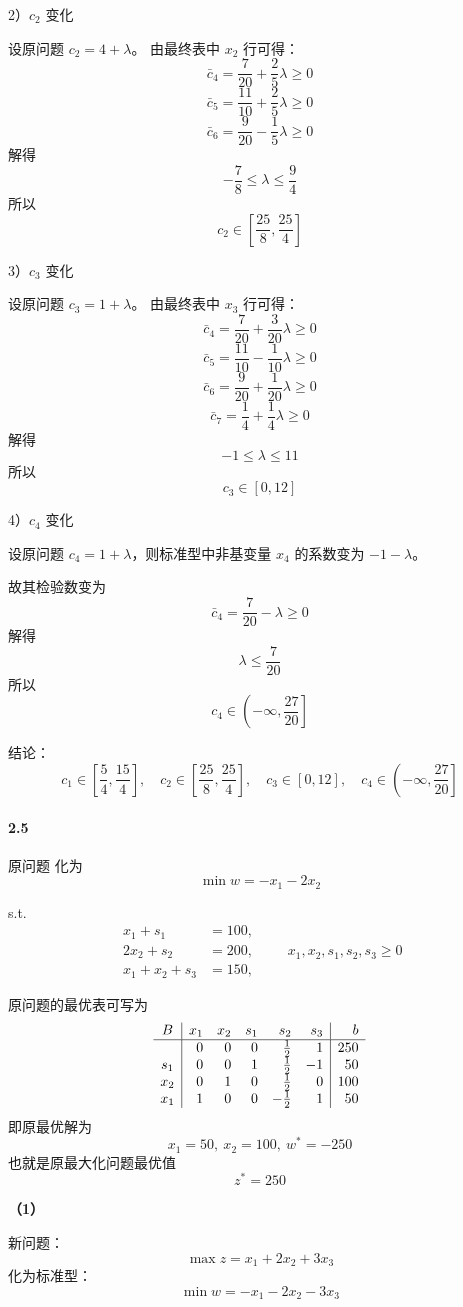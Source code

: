 \documentclass[12pt,a4paper]{article}
\begin{document}
2）$c_2$ 变化

设原问题 $c_2=4+\lambda$。
由最终表中 $x_2$ 行可得：
\[
\bar c_4=\frac7{20}+\frac25\lambda\ge 0
\]
\[
\bar c_5=\frac{11}{10}+\frac25\lambda\ge 0
\]
\[
\bar c_6=\frac9{20}-\frac15\lambda\ge 0
\]
解得
\[
-\frac78\le \lambda\le \frac94
\]
所以
\[
c_2\in \left[\frac{25}8,\frac{25}4\right]
\]

3）$c_3$ 变化

设原问题 $c_3=1+\lambda$。
由最终表中 $x_3$ 行可得：
\[
\bar c_4=\frac7{20}+\frac3{20}\lambda\ge 0
\]
\[
\bar c_5=\frac{11}{10}-\frac1{10}\lambda\ge 0
\]
\[
\bar c_6=\frac9{20}+\frac1{20}\lambda\ge 0
\]
\[
\bar c_7=\frac14+\frac14\lambda\ge 0
\]
解得
\[
-1\le \lambda\le 11
\]
所以
\[
c_3\in [0,12]
\]

4）$c_4$ 变化

设原问题 $c_4=1+\lambda$，则标准型中非基变量 $x_4$ 的系数变为 $-1-\lambda$。

故其检验数变为
\[
\bar c_4=\frac7{20}-\lambda\ge 0
\]
解得
\[
\lambda\le \frac7{20}
\]
所以
\[
c_4\in \left(-\infty,\frac{27}{20}\right]
\]

结论：
\[
c_1\in \left[\frac54,\frac{15}4\right],\quad c_2\in \left[\frac{25}8,\frac{25}4\right],\quad c_3\in [0,12],\quad c_4\in \left(-\infty,\frac{27}{20}\right]
\]

\paragraph{2.5}


原问题
化为
\[
\min w=-x_1-2x_2
\]

s.t.
\[
\begin{aligned}
x_1+s_1&=100,\\
2x_2+s_2&=200,\\
x_1+x_2+s_3&=150,
\end{aligned}
\qquad x_1,x_2,s_1,s_2,s_3\ge 0
\]

原问题的最优表可写为
\[
\begin{array}{c|rrrrr|r}
B & x_1&x_2&s_1&s_2&s_3&b\\
\hline
  & 0&0&0&\frac12&1&250\\
s_1&0&0&1&\frac12&-1&50\\
x_2&0&1&0&\frac12&0&100\\
x_1&1&0&0&-\frac12&1&50
\end{array}
\]
即原最优解为
\[
x_1=50,\ x_2=100,\ w^*=-250
\]
也就是原最大化问题最优值
\[
z^*=250
\]

\textbf{（1）}

新问题：
\[
\max z=x_1+2x_2+3x_3
\]
化为标准型：
\[
\min w=-x_1-2x_2-3x_3
\]
\end{document}
